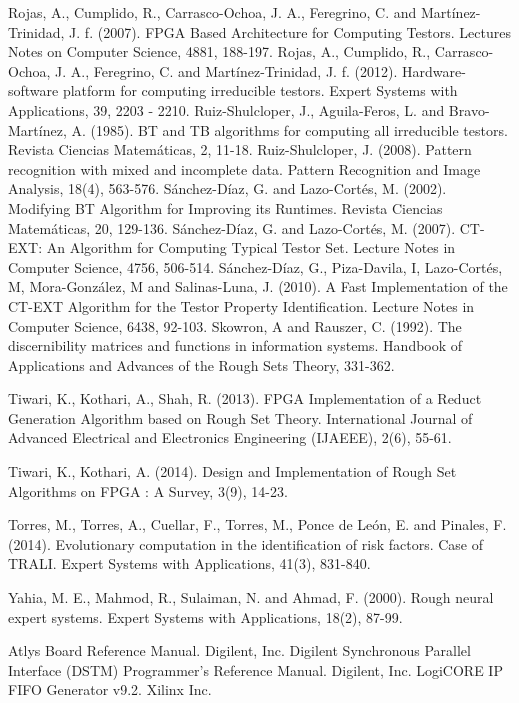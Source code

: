 \documentclass[authoryear,preprint,review,12pt]{elsarticle}
\begin{document}
\begin{thebibliography}{00}
Rojas, A., Cumplido, R., Carrasco-Ochoa, J. A., Feregrino, C. and Mart\'inez-Trinidad, J. f. (2007). FPGA Based Architecture for Computing Testors. Lectures Notes on Computer Science, 4881, 188-197.
Rojas, A., Cumplido, R., Carrasco-Ochoa, J. A., Feregrino, C. and Mart\'inez-Trinidad, J. f. (2012). Hardware-software platform for computing irreducible testors. Expert Systems with Applications, 39, 2203 - 2210.
Ruiz-Shulcloper, J., Aguila-Feros, L. and Bravo-Mart\'inez, A. (1985). BT and TB algorithms for computing all irreducible testors. Revista Ciencias Matem\'aticas, 2, 11-18.
Ruiz-Shulcloper, J. (2008). Pattern recognition with mixed and incomplete data. Pattern Recognition and Image Analysis, 18(4), 563-576.
S\'anchez-D\'iaz, G. and Lazo-Cort\'es, M. (2002). Modifying BT Algorithm for Improving its Runtimes. Revista Ciencias Matem\'aticas, 20, 129-136.
S\'anchez-D\'iaz, G. and Lazo-Cort\'es, M. (2007). CT-EXT: An Algorithm for Computing Typical Testor Set. Lecture Notes in Computer Science, 4756, 506-514.
S\'anchez-D\'iaz, G., Piza-Davila, I, Lazo-Cort\'es, M, 
Mora-Gonz\'alez, M and Salinas-Luna, J. (2010). A Fast Implementation of the CT-EXT Algorithm for the Testor Property Identification. Lecture Notes in Computer Science, 6438, 92-103.
Skowron, A and Rauszer, C. (1992). The discernibility matrices and functions in information systems. Handbook of Applications and Advances of the Rough Sets Theory, 331-362.

Tiwari, K., Kothari, A., Shah, R. (2013). FPGA Implementation of a Reduct Generation Algorithm based on Rough Set Theory. International Journal of Advanced Electrical and Electronics Engineering (IJAEEE), 2(6), 55-61.

 Tiwari, K., Kothari, A. (2014). Design and Implementation of Rough Set Algorithms on FPGA : A Survey, 3(9), 14-23.

Torres, M., Torres, A., Cuellar, F., Torres, M., Ponce de Le\'on, E. and Pinales, F. (2014). Evolutionary computation in the identification of risk factors. Case of TRALI. Expert Systems with Applications, 41(3), 831-840.

Yahia, M. E., Mahmod, R., Sulaiman, N. and Ahmad, F. (2000). Rough neural expert systems. Expert Systems with Applications, 18(2), 87-99.

Atlys Board Reference Manual. Digilent, Inc.
Digilent Synchronous Parallel Interface (DSTM) Programmer's Reference Manual. Digilent, Inc.
LogiCORE IP FIFO Generator v9.2. Xilinx Inc.


\end{thebibliography}
\end{document}
